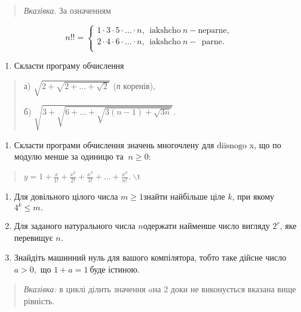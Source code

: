 \documentclass[]{article}
\begin{document}
\begin{quote}
\emph{\emph{Вказівка}}. За означенням
\end{quote}

\[n!! = \left\{ \begin{matrix}
1 \cdot 3 \cdot 5 \cdot \ldots \cdot n,\mathrm{\ \ iakshcho\ }n - \mathrm{neparne,} \\
2 \cdot 4 \cdot 6 \cdot \ldots \cdot n,\mathrm{\ \ iakshcho\ }n - \mathrm{\ \ parne.} \\
\end{matrix} \right.\ \]

\begin{enumerate}
\def\labelenumi{\arabic{enumi})}
\item
  Скласти програму обчислення
\end{enumerate}

\begin{quote}
а) \(\sqrt{2 + \sqrt{2 + \ldots + \sqrt{2}}}\) (\emph{п} коренів),

б) \(\sqrt{3 + \sqrt{6 + \ldots + \sqrt{3(n - 1) + \sqrt{3n}}}}.\)
\end{quote}

\begin{enumerate}
\def\labelenumi{\arabic{enumi})}
\item
  Скласти програми обчислення значень многочлену для
  \(\mathrm{diisn}\mathrm{ogo}\) x, що по модулю менше за одиницю та
  \(\mathrm{\ }n \geq 0:\)
\end{enumerate}

\begin{quote}
\(y = 1 + \frac{x}{1!} + \frac{x^{2}}{2!} + \frac{x^{3}}{3!} + \ldots + \frac{x^{n}}{n!}.\mathrm{\ }\mathrm{\backslash t}\)
\end{quote}

\begin{enumerate}
\def\labelenumi{\arabic{enumi})}
\item
  Для довільного цілого числа \(m \geq 1\)знайти найбільше ціле \(k\),
  при якому \(4^{k} \leq m.\)
\item
  Для заданого натурального числа \(n\)одержати найменше число вигляду
  \(2^{r}\), яке перевищує \(n\)\emph{.}
\item
  Знайдіть машинний нуль для вашого компілятора, тобто таке дійсне число
  \(a > 0,\) що \(1 + a = 1\ \)буде істиною.
\end{enumerate}

\begin{quote}
\emph{Вказівка:} в циклі ділить значення \(a\)на 2 доки не виконується
вказана вище рівність.
\end{quote}
\end{document}
